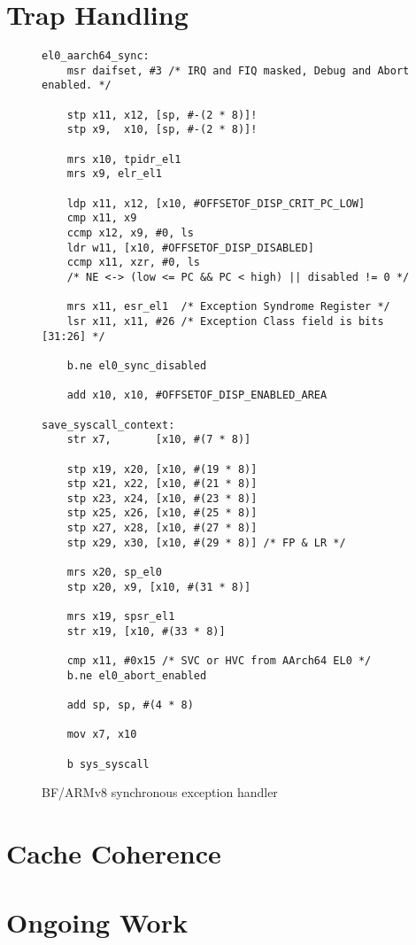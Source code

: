 \documentclass[a4paper,twoside]{report}
\begin{document}
\section{Trap Handling}\label{s:traps}

\begin{figure}
\begin{lstlisting}
el0_aarch64_sync:
    msr daifset, #3 /* IRQ and FIQ masked, Debug and Abort enabled. */

    stp x11, x12, [sp, #-(2 * 8)]!
    stp x9,  x10, [sp, #-(2 * 8)]!

    mrs x10, tpidr_el1
    mrs x9, elr_el1

    ldp x11, x12, [x10, #OFFSETOF_DISP_CRIT_PC_LOW]
    cmp x11, x9
    ccmp x12, x9, #0, ls
    ldr w11, [x10, #OFFSETOF_DISP_DISABLED]
    ccmp x11, xzr, #0, ls
    /* NE <-> (low <= PC && PC < high) || disabled != 0 */

    mrs x11, esr_el1  /* Exception Syndrome Register */
    lsr x11, x11, #26 /* Exception Class field is bits [31:26] */

    b.ne el0_sync_disabled

    add x10, x10, #OFFSETOF_DISP_ENABLED_AREA

save_syscall_context:
    str x7,       [x10, #(7 * 8)]

    stp x19, x20, [x10, #(19 * 8)]
    stp x21, x22, [x10, #(21 * 8)]
    stp x23, x24, [x10, #(23 * 8)]
    stp x25, x26, [x10, #(25 * 8)]
    stp x27, x28, [x10, #(27 * 8)]
    stp x29, x30, [x10, #(29 * 8)] /* FP & LR */

    mrs x20, sp_el0
    stp x20, x9, [x10, #(31 * 8)]

    mrs x19, spsr_el1
    str x19, [x10, #(33 * 8)]

    cmp x11, #0x15 /* SVC or HVC from AArch64 EL0 */
    b.ne el0_abort_enabled

    add sp, sp, #(4 * 8)

    mov x7, x10

    b sys_syscall
\end{lstlisting}
\caption{BF/ARMv8 synchronous exception handler}
\label{f:sync_el0}
\end{figure}

\section{Cache Coherence}

\section{Ongoing Work}



\end{document}
